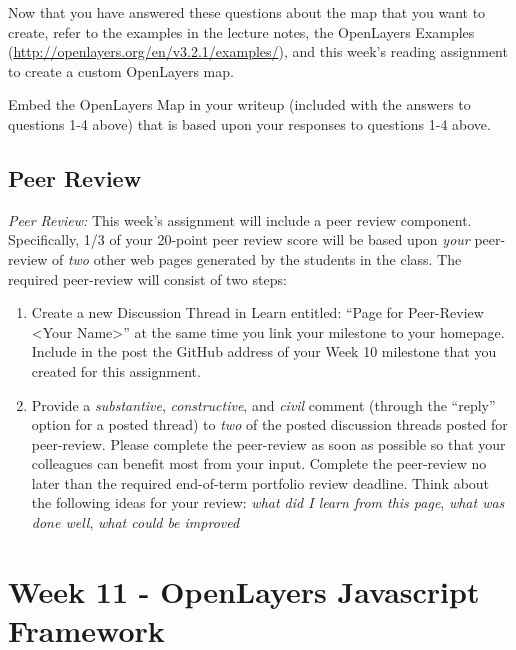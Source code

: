 \documentclass[]{book}
\providecommand{\tightlist}{%
  \setlength{\itemsep}{0pt}\setlength{\parskip}{0pt}}
\begin{document}
Now that you have answered these questions about the map that you want
to create, refer to the examples in the lecture notes, the OpenLayers
Examples (\url{http://openlayers.org/en/v3.2.1/examples/}), and this
week's reading assignment to create a custom OpenLayers map.

\begin{description}
\tightlist
\item[Question 5]
Embed the OpenLayers Map in your writeup (included with the answers to
questions 1-4 above) that is based upon your responses to questions 1-4
above.
\end{description}

\section{Peer Review}\label{peer-review}

\emph{Peer Review:} This week's assignment will include a peer review
component. Specifically, 1/3 of your 20-point peer review score will be
based upon \emph{your} peer-review of \emph{two} other web pages
generated by the students in the class. The required peer-review will
consist of two steps:

\begin{enumerate}
\def\labelenumi{\arabic{enumi}.}
\item
  Create a new Discussion Thread in Learn entitled: ``Page for
  Peer-Review \textless{}Your Name\textgreater{}'' at the same time you
  link your milestone to your homepage. Include in the post the GitHub
  address of your Week 10 milestone that you created for this
  assignment.
\item
  Provide a \emph{substantive}, \emph{constructive}, and \emph{civil}
  comment (through the ``reply'' option for a posted thread) to
  \emph{two} of the posted discussion threads posted for peer-review.
  Please complete the peer-review as soon as possible so that your
  colleagues can benefit most from your input. Complete the peer-review
  no later than the required end-of-term portfolio review deadline.
  Think about the following ideas for your review: \emph{what did I
  learn from this page}, \emph{what was done well}, \emph{what could be
  improved}
\end{enumerate}

\chapter{Week 11 - OpenLayers Javascript Framework}\label{week11}
\end{document}
